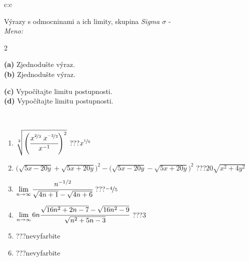 \documentclass[10pt]{report}
\begin{document}
\begin{tabular}{c:c}
\begin{minipage}[c][104.5mm][t]{0.5\linewidth}
\begin{center}
\vspace{7mm}
{\huge {\Large Výrazy s odmocninami a ich limity}, skupina \textit{Sigma $\sigma$} -}\\[5mm]
\textit{Meno:}\phantom{xxxxxxxxxxxxxxxxxxxxxxxxxxxxxxxxxxxxxxxxxxxxxxxxxxxxxxxxxxxxxxxxx}\\[5mm]
\begin{minipage}{0.95\linewidth}
\begin{center}
{\small \begin{multicols}{2} \raggedright
\phantom{xxxxxxxxx}\textbf{(a)} Zjednodušte výraz. \\[1mm]
\phantom{xxxxxxxxx}\textbf{(b)} Zjednodušte výraz. \par \columnbreak
\textbf{(c)} Vypočítajte limitu postupnosti. \\[1mm]
\textbf{(d)} Vypočítajte limitu postupnosti.
\end{multicols}
}
\end{center}
\end{minipage}
\\[4mm]
\begin{minipage}{0.79\linewidth}
\begin{center}
\begin{varwidth}{\linewidth}
\begin{enumerate}
\small
\item $\sqrt[2]{\left(\cfrac{x^{\nicefrac{2}{3}}\;x^{\nicefrac{-3}{2}}}{x^{-1}}\right)^{2}}$\quad \dotfill\; ???\;\dotfill \quad $x^{\nicefrac{1}{6}}$
\item {\footnotesize{\scriptsize$\big(\sqrt{5x-20y}+\sqrt{5x+20y}\big)^2-\big(\sqrt{5x-20y}-\sqrt{5x+20y}\big)^2$}\quad \dotfill\; ???\;\dotfill \quad $20\sqrt{x^2+4y^2}$}
\item $\lim\limits_{n\to\infty}\cfrac{n^{-1/2}}{\sqrt{4n+1}-\sqrt{4n+6}}$\quad \dotfill\; ???\;\dotfill \quad $\nicefrac{-4}{5}$
\item $\lim\limits_{n\to\infty}6n\cfrac{\sqrt{16n^2+2n-7}-\sqrt{16n^2-9}}{\sqrt{n^2+5n-3}}$\quad \dotfill\; ???\;\dotfill \quad $3$
\item \quad \dotfill\; ???\;\dotfill \quad nevyfarbite
\item \quad \dotfill\; ???\;\dotfill \quad nevyfarbite
\end{enumerate}
\end{varwidth}

\end{center}
\end{minipage}
\end{center}
\end{minipage}
\end{tabular}
\end{document}
